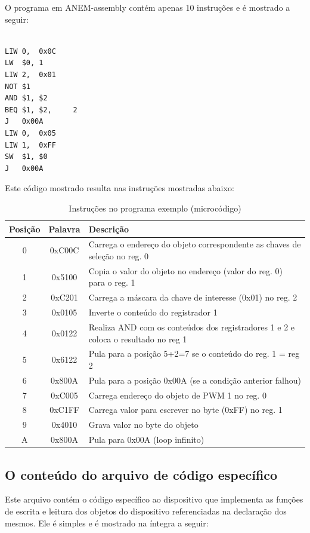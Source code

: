 \documentclass[11pt]{report}
\begin{document}
O programa em ANEM-assembly contém apenas 10 instruções e é mostrado a seguir:

\begin{verbatim}

LIW	0,	0x0C
LW	$0,	1
LIW	2,	0x01
NOT	$1
AND	$1,	$2
BEQ	$1,	$2,		2
J	0x00A
LIW	0,	0x05
LIW	1,	0xFF
SW	$1,	$0
J	0x00A

\end{verbatim}

Este código mostrado resulta nas instruções mostradas abaixo:

\begin{table}[H]
\centering
\caption{Instruções no programa exemplo (microcódigo)}
\begin{tabular}{c c p{10cm}}
\hline
Posição	&	Palavra		&	Descrição\\
\hline
0		&	0xC00C		&	Carrega o endereço do objeto correspondente as chaves de seleção no reg. 0\\
1		&	0x5100		&	Copia o valor do objeto no endereço (valor do reg. 0) para o reg. 1\\
2		&	0xC201		&	Carrega a máscara da chave de interesse (0x01) no reg. 2\\
3		&	0x0105		&	Inverte o conteúdo do registrador 1\\
4		&	0x0122		&	Realiza AND com os conteúdos dos registradores 1 e 2 e coloca o resultado no reg 1\\
5		&	0x6122		&	Pula para a posição 5+2=7 se o conteúdo do reg. 1 = reg 2\\ 
6		&	0x800A		&	Pula para a posição 0x00A (se a condição anterior falhou)\\
7		&	0xC005		&	Carrega endereço do objeto de PWM 1 no reg. 0\\
8		&	0xC1FF		&	Carrega valor para escrever no byte (0xFF) no reg. 1\\
9		&	0x4010		&	Grava valor no byte do objeto\\
A		&	0x800A		&	Pula para 0x00A (loop infinito)\\
\hline
\end{tabular}
\end{table}

\subsection{O conteúdo do arquivo de código específico}

Este arquivo contém o código específico ao dispositivo que implementa as funções de escrita e leitura dos objetos do dispositivo referenciadas na declaração dos mesmos. Ele é simples e é mostrado na íntegra a seguir:
\end{document}
